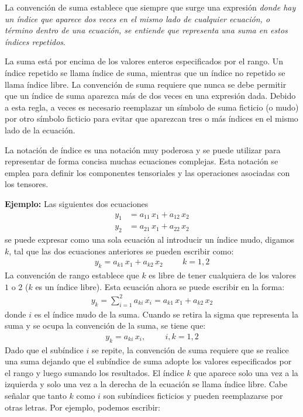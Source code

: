 La convención de suma establece que siempre que surge una expresión \emph{donde hay un índice que aparece dos veces en el mismo lado de cualquier ecuación, o término dentro de una ecuación, se entiende que representa una suma en estos índices repetidos}.
\par
La suma está por encima de los valores enteros especificados por el rango. Un índice repetido se llama índice de suma, mientras que un índice no repetido se llama índice libre. La convención de suma requiere que nunca se debe permitir que un índice de suma aparezca más de dos veces en una expresión dada. Debido a esta regla, a veces es necesario reemplazar un símbolo de suma ficticio (o mudo) por otro símbolo ficticio para evitar que aparezcan tres o más índices en el mismo lado de la ecuación.
\par
La notación de índice es una notación muy poderosa y se puede utilizar para representar de forma concisa muchas ecuaciones complejas. Esta notación se emplea para definir los componentes tensoriales y las operaciones asociadas con los tensores.
\par
\noindent
\textbf{Ejemplo: }  Las siguientes dos ecuaciones
\begin{align*}
y_{1} &= a_{11} \, x_{1} + a_{12} \, x_{2} \\[0.5em]
y_{2} &= a_{21} \, x_{1} + a_{22} \, x_{2}
\end{align*}
se puede expresar como una sola ecuación al introducir un índice mudo, digamos $k$, tal que las dos ecuaciones anteriores se pueden escribir como:
\begin{align*}
y_{k} = a_{k1} \, x_{1} + a_{k2} \, x_{2} \hspace{1cm} k = 1, 2
\end{align*}
La convención de rango establece que $k$ es libre de tener cualquiera de los valores $1$ o $2$ ($k$ es un índice libre). Esta ecuación ahora se puede escribir en la forma:
\begin{align*}
y_{k} = \sum_{i=1}^{2} a_{ki} \, x_{i} = a_{k1} \, x_{1} + a_{k2} \, x_{2}
\end{align*}
donde $i$ es el índice mudo de la suma. Cuando se retira la sigma que representa la suma y se ocupa la convención de la suma, se tiene que:
\begin{align*}
y_{k} = a_{ki} \, x_{i} , \hspace{1cm} i, k = 1, 2
\end{align*}
Dado que el subíndice $i$ se repite, la convención de suma requiere que se realice una suma dejando que el subíndice de suma adopte los valores especificados por el rango y luego sumando los resultados. El índice $k$ que aparece solo una vez a la izquierda y solo una vez a la derecha de la ecuación se llama índice libre. Cabe señalar que tanto $k$ como $i$ son subíndices ficticios y pueden reemplazarse por otras letras. Por ejemplo, podemos escribir:

